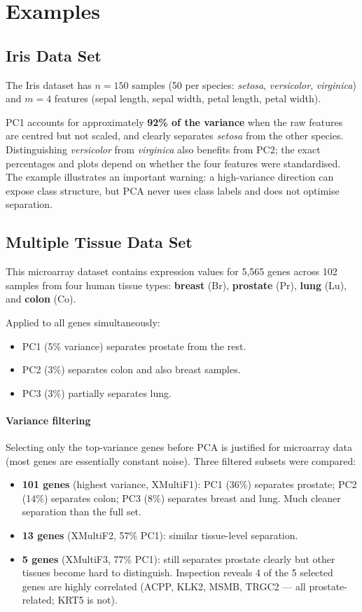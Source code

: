 \documentclass[11pt, oneside]{book}
\begin{document}
\section{Examples}

\subsection{Iris Data Set}

The Iris dataset has $n = 150$ samples (50 per species: \textit{setosa}, \textit{versicolor},
\textit{virginica}) and $m = 4$ features (sepal length, sepal width, petal length, petal width).

PC1 accounts for approximately \textbf{92\% of the variance} when the raw features are
centred but not scaled, and clearly separates \textit{setosa} from the other species.
Distinguishing \textit{versicolor} from \textit{virginica} also benefits from PC2;
the exact percentages and plots depend on whether the four features were standardised.
The example illustrates an important warning: a high-variance direction can expose
class structure, but PCA never uses class labels and does not optimise separation.

\subsection{Multiple Tissue Data Set}

This microarray dataset contains expression values for 5{,}565 genes across 102 samples
from four human tissue types: \textbf{breast} (Br), \textbf{prostate} (Pr),
\textbf{lung} (Lu), and \textbf{colon} (Co).

Applied to all genes simultaneously:
\begin{itemize}
  \item PC1 (5\% variance) separates prostate from the rest.
  \item PC2 (3\%) separates colon and also breast samples.
  \item PC3 (3\%) partially separates lung.
\end{itemize}

\paragraph{Variance filtering}
Selecting only the top-variance genes before PCA is justified for microarray data
(most genes are essentially constant noise).
Three filtered subsets were compared:
\begin{itemize}
  \item \textbf{101 genes} (highest variance, XMultiF1): PC1 (36\%) separates prostate;
        PC2 (14\%) separates colon; PC3 (8\%) separates breast and lung.
        Much cleaner separation than the full set.
  \item \textbf{13 genes} (XMultiF2, 57\% PC1): similar tissue-level separation.
  \item \textbf{5 genes} (XMultiF3, 77\% PC1): still separates prostate clearly but
        other tissues become hard to distinguish.
        Inspection reveals 4 of the 5 selected genes are highly correlated (ACPP, KLK2,
        MSMB, TRGC2 --- all prostate-related; KRT5 is not).
\end{itemize}
\end{document}
